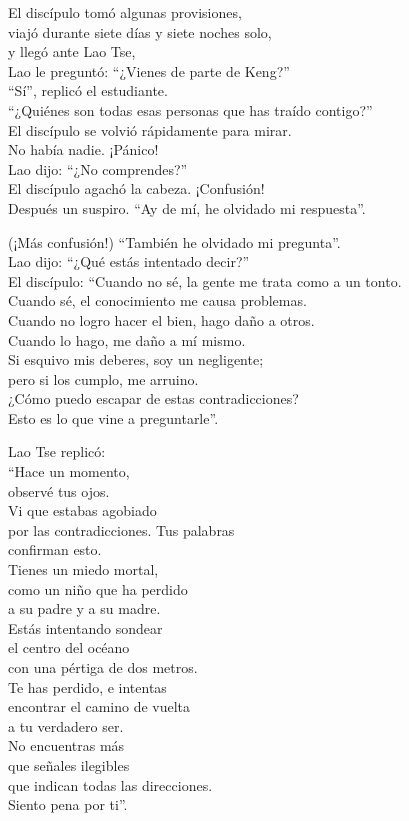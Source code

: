 \documentclass[book,b5paper,hidelinks,final]{memoir}
\begin{document}
	El discípulo tomó algunas provisiones,\\
	viajó durante siete días y siete noches solo,\\
	y llegó ante Lao Tse,\\
	Lao le preguntó: ``¿Vienes de parte de Keng?''\\
	``Sí'', replicó el estudiante.\\
	``¿Quiénes son todas esas personas que has traído contigo?''\\
	El discípulo se volvió rápidamente para mirar.\\
	No había nadie. ¡Pánico!\\
	Lao dijo: ``¿No comprendes?''\\
	El discípulo agachó la cabeza. ¡Confusión!\\
	Después un suspiro. ``Ay de mí, he olvidado mi respuesta''.
	
	(¡Más confusión!) ``También he olvidado mi pregunta''.\\
	Lao dijo: ``¿Qué estás intentado decir?''\\
	El discípulo: ``Cuando no sé, la gente me trata como a un tonto.\\
	Cuando sé, el conocimiento me causa problemas.\\
	Cuando no logro hacer el bien, hago daño a otros.\\
	Cuando lo hago, me daño a mí mismo.\\
	Si esquivo mis deberes, soy un negligente;\\
	pero si los cumplo, me arruino.\\
	¿Cómo puedo escapar de estas contradicciones?\\
	Esto es lo que vine a preguntarle''.
	
	Lao Tse replicó:\\
	``Hace un momento,\\
	observé tus ojos.\\
	Vi que estabas agobiado\\
	por las contradicciones. Tus palabras\\
	confirman esto.\\
	Tienes un miedo mortal,\\
	como un niño que ha perdido\\
	a su padre y a su madre.\\
	Estás intentando sondear\\
	el centro del océano\\
	con una pértiga de dos metros.\\
	Te has perdido, e intentas\\
	encontrar el camino de vuelta\\
	a tu verdadero ser.\\
	No encuentras más\\
	que señales ilegibles\\
	que indican todas las direcciones.\\
	Siento pena por ti''.
	
\end{document}
